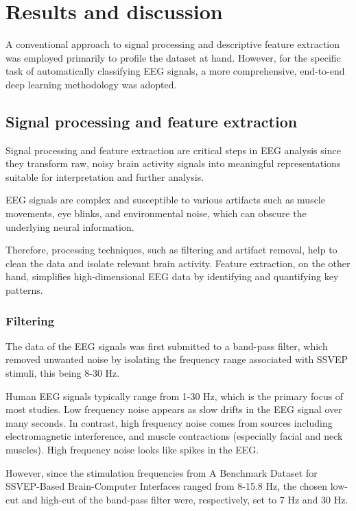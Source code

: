 \section{Results and discussion}

A conventional approach to signal processing and descriptive feature extraction was employed primarily to profile the dataset at hand. However, for the specific task of automatically classifying EEG signals, a more comprehensive, end-to-end deep learning methodology was adopted.


\subsection{Signal processing and feature extraction}
Signal processing and feature extraction are critical steps in EEG analysis since they transform raw, noisy brain activity signals into meaningful representations suitable for interpretation and further analysis. 

EEG signals are complex and susceptible to various artifacts such as muscle movements, eye blinks, and environmental noise, which can obscure the underlying neural information. 

Therefore, processing techniques, such as filtering and artifact removal, help to clean the data and isolate relevant brain activity. Feature extraction, on the other hand, simplifies high-dimensional EEG data by identifying and quantifying key patterns. 

\subsubsection{Filtering}

The data of the EEG signals was first submitted to a band-pass filter, which removed unwanted noise by isolating the frequency range associated with SSVEP stimuli, this being 8-30 Hz. 

Human EEG signals typically range from 1-30 Hz, which is the primary focus of most studies. Low frequency noise appears as slow drifts in the EEG signal over many seconds. In contrast, high frequency noise comes from sources including electromagnetic interference, and muscle contractions (especially facial and neck muscles). High frequency noise looks like spikes in the EEG.

However, since the stimulation frequencies from A Benchmark Dataset for SSVEP-Based Brain-Computer Interfaces ranged from 8-15.8 Hz, the chosen low-cut and high-cut of the band-pass filter were, respectively, set to 7 Hz and 30 Hz.

